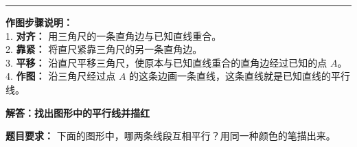 \vspace{1.0cm}
\hrule
\vspace{0.4cm}

{\small
\textbf{作图步骤说明：} \\
1. \textbf{对齐：} 用三角尺的一条直角边与已知直线重合。 \\
2. \textbf{靠紧：} 将直尺紧靠三角尺的另一条直角边。 \\
3. \textbf{平移：} 沿直尺平移三角尺，使原本与已知直线重合的直角边经过已知的点 $A$。 \\
4. \textbf{作图：} 沿三角尺经过点 $A$ 的这条边画一条直线，这条直线就是已知直线的平行线。
}




\newpage

\begin{center}
  {\large\bfseries 解答：找出图形中的平行线并描红}
\end{center}

\vspace{0.6cm}

\noindent
{\small \textbf{题目要求：} 下面的图形中，哪两条线段互相平行？用同一种颜色的笔描出来。}

\vspace{0.8cm}

